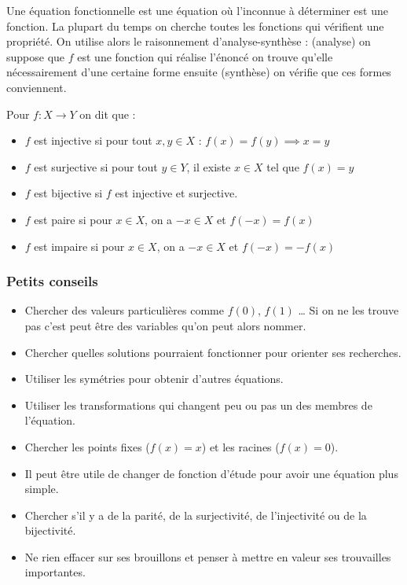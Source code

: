 \begin{rappel}
Une équation fonctionnelle est une équation où l'inconnue à déterminer est une fonction. La plupart du temps on cherche toutes les fonctions qui vérifient une propriété. On utilise alors le raisonnement d'analyse-synthèse : (analyse) on suppose que $f$ est une fonction qui réalise l'énoncé on trouve qu'elle nécessairement d'une certaine forme ensuite (synthèse) on vérifie que ces formes conviennent.
\end{rappel}
\begin{rappel}
Pour $f : X\to Y$ on dit que :
\begin{itemize}
    \item $f$ est injective si pour tout $x,y\in X$ : $f(x)=f(y)\implies x=y$
    \item $f$ est surjective si pour tout $y\in Y$, il existe $x\in X$ tel que $f(x)=y$
    \item $f$ est bijective si $f$ est injective et surjective.
    \item $f$ est paire si pour $x\in X$, on a $-x\in X$ et $f(-x)=f(x)$
    \item $f$ est impaire si pour $x\in X$, on a $-x\in X$ et $f(-x)=-f(x)$
\end{itemize}
\end{rappel}

\subsubsection{Petits conseils}

\begin{itemize}
    \item Chercher des valeurs particulières comme $f(0)$, $f(1)$ … Si on ne les trouve pas c'est peut être des variables qu'on peut alors nommer.
    \item Chercher quelles solutions pourraient fonctionner pour orienter ses recherches.
    \item Utiliser les symétries pour obtenir d'autres équations.
    \item Utiliser les transformations qui changent peu ou pas un des membres de l'équation.
    \item Chercher les points fixes ($f(x)=x$) et les racines ($f(x)=0$).
    \item Il peut être utile de changer de fonction d'étude pour avoir une équation plus simple.
    \item Chercher s'il y a de la parité, de la surjectivité, de l'injectivité ou de la bijectivité.
    \item Ne rien effacer sur ses brouillons et penser à mettre en valeur ses trouvailles importantes.
\end{itemize}

